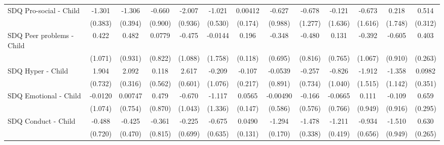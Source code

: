 {\begin{tabular}{l*{12}{c}}
\addlinespace
SDQ Pro-social - Child&      -1.301\sym{***}&      -1.306\sym{***}&      -0.660         &      -2.007\sym{*}  &      -1.021         &     0.00412         &      -0.627         &      -0.678         &      -0.121         &      -0.673         &       0.218         &       0.514         \\
            &     (0.383)         &     (0.394)         &     (0.900)         &     (0.936)         &     (0.530)         &     (0.174)         &     (0.988)         &     (1.277)         &     (1.636)         &     (1.616)         &     (1.748)         &     (0.312)         \\
\addlinespace
SDQ Peer problems - Child&       0.422         &       0.482         &      0.0779         &      -0.475         &     -0.0144         &       0.196         &      -0.348         &      -0.480         &       0.131         &      -0.392         &      -0.605         &       0.403         \\
            &     (1.071)         &     (0.931)         &     (0.822)         &     (1.088)         &     (1.758)         &     (0.118)         &     (0.695)         &     (0.816)         &     (0.765)         &     (1.067)         &     (0.910)         &     (0.263)         \\
\addlinespace
SDQ Hyper - Child&       1.904\sym{**} &       2.092\sym{***}&       0.118         &       2.617\sym{***}&      -0.209         &      -0.107         &     -0.0539         &      -0.257         &      -0.826         &      -1.912         &      -1.358         &      0.0982         \\
            &     (0.732)         &     (0.316)         &     (0.562)         &     (0.601)         &     (1.076)         &     (0.217)         &     (0.891)         &     (0.734)         &     (1.040)         &     (1.515)         &     (1.142)         &     (0.351)         \\
\addlinespace
SDQ Emotional - Child&     -0.0120         &     0.00747         &       0.479         &      -0.670         &      -1.117         &      0.0565         &    -0.00490         &      -0.166         &     -0.0665         &       0.111         &      -0.109         &       0.659\sym{*}  \\
            &     (1.074)         &     (0.754)         &     (0.870)         &     (1.043)         &     (1.336)         &     (0.147)         &     (0.586)         &     (0.576)         &     (0.766)         &     (0.949)         &     (0.916)         &     (0.295)         \\
\addlinespace
SDQ Conduct - Child&      -0.488         &      -0.425         &      -0.361         &      -0.225         &      -0.675         &      0.0490         &      -1.294\sym{***}&      -1.478\sym{***}&      -1.211\sym{**} &      -0.934         &      -1.510         &       0.630\sym{*}  \\
            &     (0.720)         &     (0.470)         &     (0.815)         &     (0.699)         &     (0.635)         &     (0.131)         &     (0.170)         &     (0.338)         &     (0.419)         &     (0.656)         &     (0.949)         &     (0.265)         \\
\bottomrule
\end{tabular}
}
